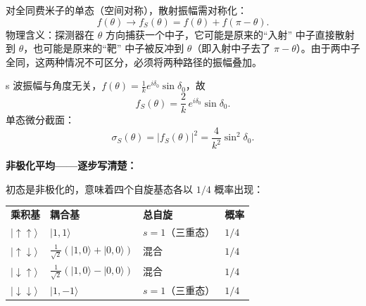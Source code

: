 \begin{derivationbox}
对全同费米子的单态（空间对称），散射振幅需对称化：
\[
f(\theta) \longrightarrow f_S(\theta) = f(\theta) + f(\pi - \theta).
\]
物理含义：探测器在 $\theta$ 方向捕获一个中子，它可能是原来的``入射'' 中子直接散射到 $\theta$，也可能是原来的``靶'' 中子被反冲到 $\theta$（即入射中子去了 $\pi - \theta$）。由于两中子全同，这两种情况不可区分，必须将两种路径的振幅叠加。

s 波振幅与角度无关，$f(\theta) = \frac{1}{k}e^{i\delta_0}\sin\delta_0$，故
\[
f_S(\theta) = \frac{2}{k}\, e^{i\delta_0}\sin\delta_0.
\]
单态微分截面：
\[
\sigma_S(\theta) = |f_S(\theta)|^2 = \frac{4}{k^2}\sin^2\delta_0.
\]

\textbf{非极化平均——逐步写清楚：}

初态是非极化的，意味着四个自旋基态各以 $1/4$ 概率出现：

\begin{tabular}{llll}
\textbf{乘积基} & \textbf{耦合基} & \textbf{总自旋} & \textbf{概率} \\
$|{\uparrow\uparrow}\rangle$ & $|1, 1\rangle$ & $s = 1$（三重态） & $1/4$ \\
$|{\uparrow\downarrow}\rangle$ & $\frac{1}{\sqrt{2}}(|1, 0\rangle + |0, 0\rangle)$ & 混合 & $1/4$ \\
$|{\downarrow\uparrow}\rangle$ & $\frac{1}{\sqrt{2}}(|1, 0\rangle - |0, 0\rangle)$ & 混合 & $1/4$ \\
$|{\downarrow\downarrow}\rangle$ & $|1, -1\rangle$ & $s = 1$（三重态） & $1/4$ \\
\end{tabular}
\end{derivationbox}
